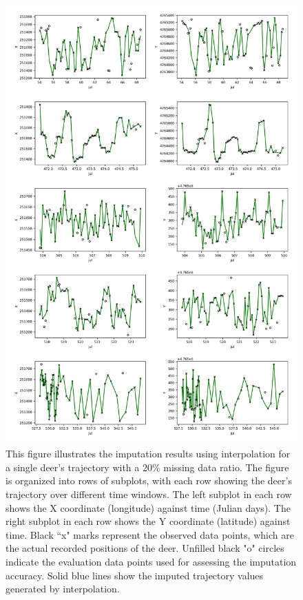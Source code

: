 \documentclass[11pt]{article}
\begin{document}
\begin{figure}[h]
  \centering
  \includegraphics[width=\textwidth]{../figure/20_5094_interpolation} %
  \caption{This figure illustrates the imputation results using interpolation for a single deer's trajectory with a 20\% missing data ratio. The figure is organized into rows of subplots, with each row showing the deer's trajectory over different time windows. The left subplot in each row shows the X coordinate (longitude) against time (Julian days). The right subplot in each row shows the Y coordinate (latitude) against time. Black ``x" marks represent the observed data points, which are the actual recorded positions of the deer. Unfilled black "o" circles indicate the evaluation data points used for assessing the imputation accuracy. Solid blue lines show the imputed trajectory values generated by interpolation.}
  \label{fig: interpolation_20} %
\end{figure}
\end{document}
